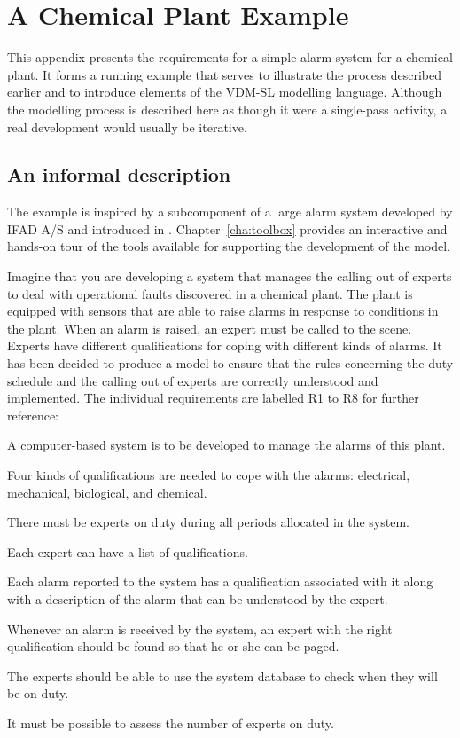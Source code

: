 \appendix

\chapter{A Chemical Plant Example}\label{app:alarm}

This appendix presents the requirements for a simple alarm system for a chemical plant. It forms a running example that serves to illustrate the process described earlier and to introduce elements of the VDM-SL modelling language. Although the modelling process is described here as though it were a single-pass activity, a real development would usually be iterative. 
%
\section{An informal description}
The example is inspired by a subcomponent of a large alarm system developed by IFAD A/S and introduced in 
\cite{Fitzgerald&98b}. Chapter~\ref{cha:toolbox} provides an interactive and hands-on tour of the tools available for supporting the development of the model.

Imagine that you are developing a system that manages the calling out of experts to deal with operational faults discovered in a chemical plant.  The plant is equipped with sensors that are able to raise alarms in response to conditions in the plant.  When an alarm is raised, an expert must be called to the scene.  Experts have different qualifications for coping with different kinds of alarms. It has been decided to produce a model to ensure that the rules concerning the duty schedule and the calling out of experts are correctly understood and implemented. The individual requirements are labelled R1 to R8 for further reference:

\begin{reqs}
\item A computer-based system is to be developed to manage the alarms of this plant.
\item Four kinds of qualifications are needed to cope with the alarms: electrical, mechanical, biological, and chemical.
\item There must be experts on duty during all periods allocated in the system.
\item Each expert can have a list of qualifications.
\item Each alarm reported to the system has a qualification associated with it along with a description of the alarm that can be understood by the expert.
\item Whenever an alarm is received by the system, an expert with the right qualification should be found so that he or she can be paged.
\item The experts should be able to use the system database to check when they will be on duty.
\item It must be possible to assess the number of experts on duty.
\end{reqs}


